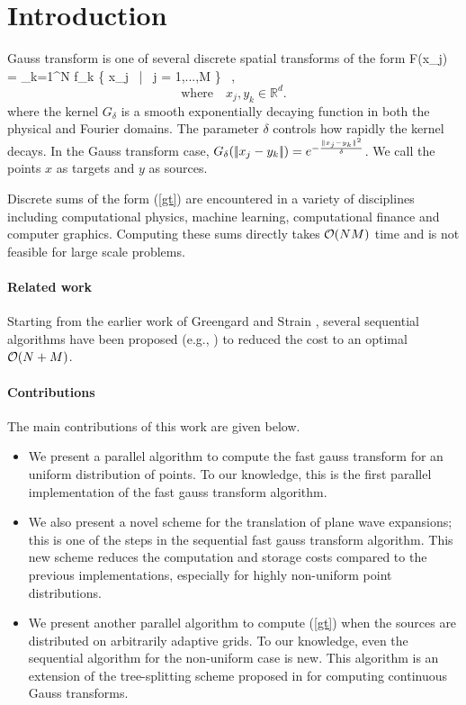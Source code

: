 \documentclass[conference]{IEEEtran}
\begin{document}
\section{Introduction}  \label{s:intro}
Gauss transform is one of several discrete spatial transforms of the form 
%
\beq F(x_j) = \sum_{k=1}^N  f_k \quad {} \quad \{ x_j \, | \, j = 1,...,M \} \, , \label{gt} \eeq
\[\text{where} \quad x_j, y_k \in \mathbb{R}^d. \]
%
where the kernel $G_\delta$ is a smooth exponentially decaying function in both the physical
and Fourier domains. The parameter $\delta$ controls how rapidly the kernel decays.  
In the Gauss transform case, $G_\delta (|\!| x_j - y_k |\!|) = e^{-\frac{\|x_j - y_k\|^2}{\delta}}$.  We call the
points $x$ as targets and $y$ as sources.  

Discrete sums of the form (\ref{gt}) are encountered in a variety of disciplines 
including computational physics, machine learning, computational finance and computer 
graphics. Computing these sums directly takes $\mathcal{O}(NM)$ time and is not feasible
for large scale problems. 

\paragraph{Related work}
Starting from the earlier work of Greengard and Strain \cite{fgt}, several sequential algorithms have 
been proposed (e.g.,  \cite{greengard98, duraiswami03, fggt}) to reduced the 
cost to an optimal $\mathcal{O}(N+M)$. 

\paragraph{Contributions}
The main contributions of this work are given below.
\begin{itemize} 
\item We present a parallel algorithm to compute the fast gauss transform for an 
uniform distribution of points. To our knowledge, this is the first parallel 
implementation of the fast gauss transform algorithm. 
\item We also present a novel scheme for the translation of plane wave expansions; this is one
of the steps in the sequential fast gauss transform algorithm. This new scheme reduces the 
computation and storage costs compared to the previous implementations, especially for highly
non-uniform point distributions.
\item We present another parallel algorithm to compute (\ref{gt}) when the sources are distributed
on arbitrarily adaptive grids. To our knowledge, even the sequential algorithm for the non-uniform case
 is new. This algorithm is an extension of the tree-splitting scheme proposed in \cite{veerapaneni08} 
 for computing continuous Gauss transforms. 
\end{itemize}
\end{document}
